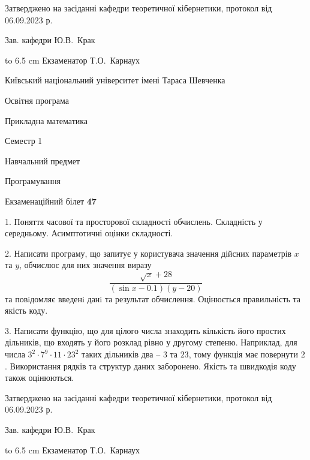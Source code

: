 \documentclass[12pt, ukrainian]{article}
\begin{document}
{\smallskip\smallskip \begin {scriptsize} Затверджено на засіданні кафедри теоретичної кібернетики, протокол   від   06.09.2023 р.\par\smallskip\smallskip\smallskip\smallskip
{\parbox {6.5 cm} {Зав. кафедри \dotfill Ю.В.~Крак}}\hspace {0.7cm} {\hbox to 6.5 cm { Екзаменатор \dotfill Т.О.~Карнаух}} \end{scriptsize}}
\vspace{0.9cm}
{{\begin {scriptsize}\par
{ \center  Київський національний університет імені Тараса Шевченка \par}
{\parbox {5 cm}{Освітня програма \hfill}{\parbox {7 cm}{Прикладна математика\hfill}}\parbox {6 cm}{\hfill Семестр 1}}\par
{\parbox {5 cm} {Навчальний предмет \hfill}\parbox {7 cm}{Програмування \hfill}\parbox {6cm}{\hfill}\par}\vspace{-15pt} \end{scriptsize}}{\center Екзаменаційний білет \No \textbf { 47 }\par}}
{%
1. Поняття часової та просторової складності обчислень. Складність у середньому. Асимптотичні оцінки складності.%
\par
2. Написати програму, що запитує у користувача значення дійсних параметрів $x$ та $y$, обчислює для них значення виразу 
$$\frac{\sqrt x + 28}{(\sin x - 0.1) (y - 20)}$$ 
та повiдомляє введенi данi та результат обчислення.
 Оцінюється правильність та якість коду.

\par
3. Написати функцію, що для цілого числа знаходить кількість його простих дільників, що входять у його розклад рівно у другому степеню. Наприклад, для числа $3^2{\cdot}7^9{\cdot}11{\cdot}23^{2}$ таких дільників два – $3$ та $23$, тому функція має повернути $2$.  Використання рядків та структур даних заборонено. Якість та швидкодія коду також оцінюються. 

}
{\smallskip\smallskip \begin {scriptsize} Затверджено на засіданні кафедри теоретичної кібернетики, протокол   від   06.09.2023 р.\par\smallskip\smallskip\smallskip\smallskip
{\parbox {6.5 cm} {Зав. кафедри \dotfill Ю.В.~Крак}}\hspace {0.7cm} {\hbox to 6.5 cm { Екзаменатор \dotfill Т.О.~Карнаух}} \end{scriptsize}}
\end{document}
